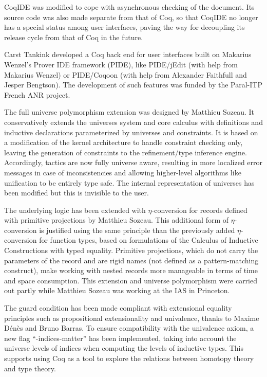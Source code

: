 CoqIDE was modified to cope with asynchronous checking of the
document.  Its source code was also made separate from that of Coq, so
that CoqIDE no longer has a special status among user interfaces,
paving the way for decoupling its release cycle from that of Coq in
the future.

Carst Tankink developed a Coq back end for user interfaces built on
Makarius Wenzel's Prover IDE framework (PIDE), like PIDE/jEdit (with
help from Makarius Wenzel) or PIDE/Coqoon (with help from Alexander
Faithfull and Jesper Bengtson).  The development of such features was
funded by the Paral-ITP French ANR project.

The full universe polymorphism extension was designed by Matthieu
Sozeau. It conservatively extends the universes system and core calculus
with definitions and inductive declarations parameterized by universes
and constraints. It is based on a modification of the kernel architecture to
handle constraint checking only, leaving the generation of constraints
to the refinement/type inference engine. Accordingly, tactics are now
fully universe aware, resulting in more localized error messages in case
of inconsistencies and allowing higher-level algorithms like unification
to be entirely type safe. The internal representation of universes has
been modified but this is invisible to the user. 

The underlying logic has been extended with $\eta$-conversion for
records defined with primitive projections by Matthieu Sozeau. This
additional form of $\eta$-conversion is justified using the same
principle than the previously added $\eta$-conversion for function
types, based on formulations of the Calculus of Inductive Constructions
with typed equality. Primitive projections, which do not carry the
parameters of the record and are rigid names (not defined as a
pattern-matching construct), make working with nested records more
manageable in terms of time and space consumption. This extension and
universe polymorphism were carried out partly while Matthieu Sozeau was working
at the IAS in Princeton.

The guard condition has been made compliant with extensional equality
principles such as propositional extensionality and univalence, thanks to
Maxime Dénès and Bruno Barras. To ensure compatibility with the
univalence axiom, a new flag ``-indices-matter'' has been implemented, 
taking into account the universe levels of indices when computing the
levels of inductive types. This supports using Coq as a tool to explore
the relations between homotopy theory and type theory.

